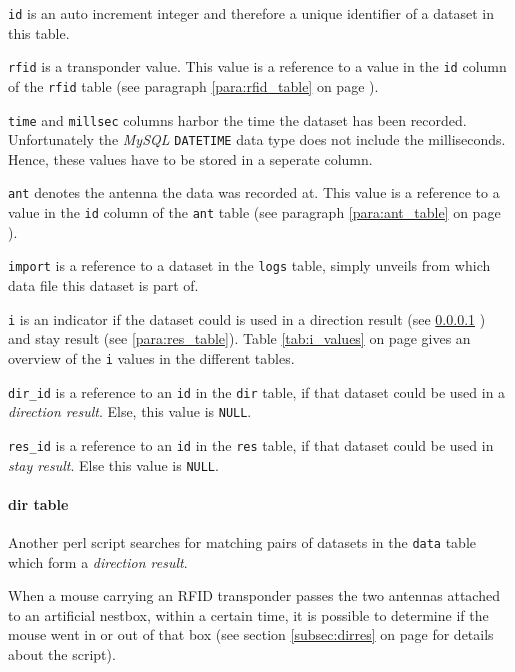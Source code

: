 \begin{mydesc}
  \item \lstinline|id| is an auto increment integer and therefore a unique identifier of a dataset in this table.
  \item \lstinline|rfid| is a transponder value. This value is a reference to a value in the \lstinline|id| column of the \lstinline|rfid| table (see paragraph \ref{para:rfid_table} on page \pageref{para:rfid_table}).
  \item \lstinline|time| and \lstinline|millsec| columns harbor the time the dataset has been recorded. Unfortunately the \textit{MySQL} \lstinline|DATETIME| data type does not include the milliseconds. Hence, these values have to be stored in a seperate column.
  \item \lstinline|ant| denotes the antenna the data was recorded at. This value is a reference to a value in the \lstinline|id| column of the \lstinline|ant| table (see paragraph \ref{para:ant_table} on page \pageref{para:ant_table}).
  \item \lstinline|import| is a reference to a dataset in the \lstinline|logs| table, simply unveils from which data file this dataset is part of.
  \item \lstinline|i| is an indicator if the dataset could is used in a direction result (see \ref{para:dir_table} ) and stay result (see \ref{para:res_table}). Table \ref{tab:i_values} on page \pageref{tab:i_values} gives an overview of the \lstinline|i| values in the different tables.
  \item \lstinline|dir_id| is a reference to an \lstinline|id| in the \lstinline|dir| table, if that dataset could be used in a \textit{direction result}. Else, this value is \lstinline|NULL|.
  \item \lstinline|res_id| is a reference to an \lstinline|id| in the \lstinline|res| table, if that dataset could be used in \textit{stay result}. Else this value is \lstinline|NULL|.
\end{mydesc}

\paragraph{dir table}
\label{para:dir_table}
Another \ac{perl} script searches for matching pairs of datasets in the \lstinline|data| table which form a \textit{direction result}.

When a mouse carrying an \ac{RFID} transponder passes the two antennas attached to an artificial nestbox, within a certain time, it is possible to determine if the mouse went in or out of that box (see section \ref{subsec:dirres} on page \pageref{subsec:dirres} for details about the script). 


